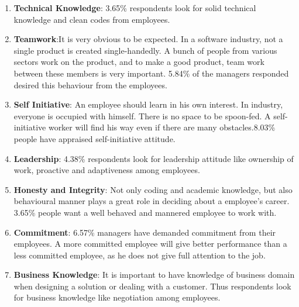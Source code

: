\begin{enumerate}

    \item \textbf{Technical Knowledge}: 3.65\% respondents look for solid technical knowledge and clean codes from employees.
    
    
    
    \item \textbf{Teamwork}:It is very obvious to be expected. In a software industry, not a single product is created single-handedly. A bunch of people from various sectors work on the product, and to make a good product, team work between these members is very important. 5.84\% of the managers responded desired this behaviour from the employees.
    
    
    \item \textbf{Self Initiative}: An employee should learn in his own interest. In industry, everyone is occupied with himself. There is no space to be spoon-fed. A self-initiative worker will find his way even if there are many obstacles.8.03\% people have appraised self-initiative attitude.


    \item \textbf{Leadership}: 4.38\% respondents look for leadership attitude like ownership of work, proactive and adaptiveness among employees.
    
    \item \textbf{Honesty and Integrity}: Not only coding and academic knowledge, but also behavioural manner plays a great role in deciding about a employee’s career. 3.65\% people want a well behaved and mannered employee to work with.
    
    
    \item \textbf{Commitment}: 6.57\% managers have demanded commitment from their employees. A more committed employee will give better performance than a less committed employee, as he does not give full attention to the job.
    
    
    \item \textbf{Business Knowledge}:  It is important to have knowledge of business domain when designing a solution or dealing with a customer. Thus respondents look for business knowledge like negotiation among employees.


\end{enumerate}


